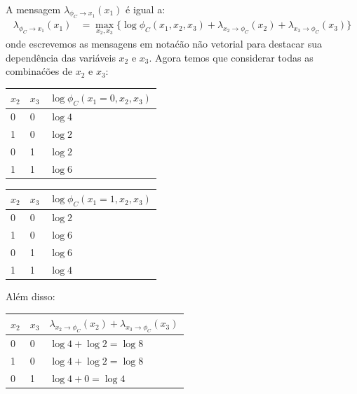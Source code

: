 \begin{exenumerate}
\begin{solution}
\begin{align}
        \end{align}
        A mensagem $\lambda_{\phi_C \to x_1}(x_1)$ \'e igual a:
        \begin{align}
            \lambda_{\phi_C \to x_1}(x_1) & = \max_{x_2, x_3} \{ \log \phi_C(x_1, x_2, x_3) + \lambda_{x_2 \to \phi_C}(x_2) + \lambda_{x_3 \to \phi_C}(x_3) \}
        \end{align}
        onde escrevemos as mensagens em nota\'c\~ao n\~ao vetorial para destacar sua depend\^encia das vari\'aveis $x_2$ e $x_3$. Agora temos que considerar todas as combina\'c\~oes de $x_2$ e $x_3$:
        \begin{center}
            \begin{tabular}{lll}
                \toprule
                $x_2$ & $x_3$ & $\log \phi_C(x_1=0, x_2, x_3)$\\
                \midrule
                0 & 0 & $\log 4$ \\
                1 & 0 &  $\log 2$\\
                0 & 1 & $\log 2$ \\
                1 & 1 & $\log 6$ \\
                \bottomrule
            \end{tabular}
            \hspace{4ex}
            \begin{tabular}{lll}
                \toprule
                $x_2$ & $x_3$ & $\log \phi_C(x_1=1, x_2, x_3)$\\
                \midrule
                0 & 0 & $\log 2$  \\
                1 & 0 & $\log 6 $ \\
                0 & 1 & $\log 6$  \\
                1 & 1 & $\log 4$ \\
                \bottomrule
            \end{tabular}
        \end{center}
        Al\'em disso:
        \begin{center}
            \begin{tabular}{lll}
                \toprule
                $x_2$ & $x_3$ & $\lambda_{x_2 \to \phi_C}(x_2) + \lambda_{x_3 \to \phi_C}(x_3)$\\
                \midrule
                0 & 0 & $\log 4 + \log 2 = \log 8$  \\
                1 & 0 & $\log 4 + \log 2 = \log 8$\\
                0 & 1 & $\log 4 + 0 = \log 4$\\

\end{tabular}
\end{center}
\end{solution}
\end{exenumerate}
